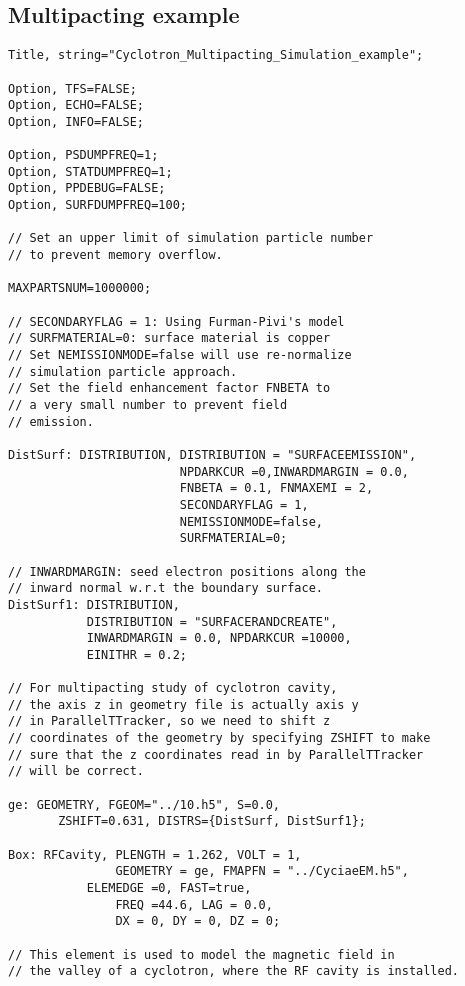 \documentclass[a4paper,11pt]{article}
\begin{document}
\subsection{Multipacting example}
\begin{verbatim}
Title, string="Cyclotron_Multipacting_Simulation_example";

Option, TFS=FALSE;
Option, ECHO=FALSE;
Option, INFO=FALSE;

Option, PSDUMPFREQ=1;
Option, STATDUMPFREQ=1;
Option, PPDEBUG=FALSE;
Option, SURFDUMPFREQ=100;

// Set an upper limit of simulation particle number 
// to prevent memory overflow. 

MAXPARTSNUM=1000000;

// SECONDARYFLAG = 1: Using Furman-Pivi's model
// SURFMATERIAL=0: surface material is copper 
// Set NEMISSIONMODE=false will use re-normalize 
// simulation particle approach. 
// Set the field enhancement factor FNBETA to 
// a very small number to prevent field 
// emission.

DistSurf: DISTRIBUTION, DISTRIBUTION = "SURFACEEMISSION", 
                        NPDARKCUR =0,INWARDMARGIN = 0.0, 
                        FNBETA = 0.1, FNMAXEMI = 2,  
                        SECONDARYFLAG = 1, 
                        NEMISSIONMODE=false, 
                        SURFMATERIAL=0; 

// INWARDMARGIN: seed electron positions along the 
// inward normal w.r.t the boundary surface.
DistSurf1: DISTRIBUTION, 
           DISTRIBUTION = "SURFACERANDCREATE",
           INWARDMARGIN = 0.0, NPDARKCUR =10000, 
           EINITHR = 0.2; 

// For multipacting study of cyclotron cavity, 
// the axis z in geometry file is actually axis y 
// in ParallelTTracker, so we need to shift z 
// coordinates of the geometry by specifying ZSHIFT to make 
// sure that the z coordinates read in by ParallelTTracker 
// will be correct.
						    
ge: GEOMETRY, FGEOM="../10.h5", S=0.0, 
       ZSHIFT=0.631, DISTRS={DistSurf, DistSurf1};

Box: RFCavity, PLENGTH = 1.262, VOLT = 1, 
               GEOMETRY = ge, FMAPFN = "../CyciaeEM.h5",
	       ELEMEDGE =0, FAST=true, 
               FREQ =44.6, LAG = 0.0, 
               DX = 0, DY = 0, DZ = 0;

// This element is used to model the magnetic field in 
// the valley of a cyclotron, where the RF cavity is installed.
 

\end{verbatim}
\end{document}
